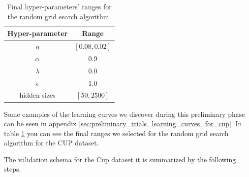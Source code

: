 \documentclass[11pt,twoside]{article}
\begin{document}
        \begin{table}[hbtp]
            \centering
            \begin{tabular}{| c | c |}
                \hline
                Hyper-parameter & Range \\
                \hline
                $\eta$ & $\left [ 0.08, 0.02 \right ]$ \\
                \hline
                $\alpha$ & $0.9$ \\
                \hline
                $\lambda$ & $0.0$ \\
                \hline
                $\epsilon$ & $1.0$ \\
                \hline
                hidden sizes & $\left [ 50, 2500 \right ]$ \\
                \hline
            \end{tabular}
            \caption{Final hyper-parameters' ranges for the random grid search algorithm.}
            \label{tab:hyper_ranges}
        \end{table}
        Some examples of the learning curves we discover during this preliminary phase can be seen in appendix
        \ref{sec:preliminary_trials_learning_curves_for_cup}. In table \ref{tab:hyper_ranges} you can see the
        final ranges we selected for the random grid search algorithm for the CUP dataset.

\newpage
The validation schema for the Cup dataset it is summarized by the following steps.
\end{document}
